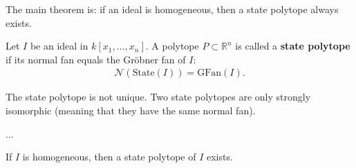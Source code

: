 \documentclass[a4paper, 11pt]{article}
\begin{document}

The main theorem is: if an ideal is homogeneous, then a state polytope always exists.

\begin{defi}
  Let \( I \) be an ideal in \( k[x_1, \dots, x_n] \). A polytope \( P \subset \mathbb R^n \) is called a \textbf{state polytope} if its normal fan equals the Gröbner fan of \( I \):
  \begin{align*}
    \mathcal{N}(\mathrm{State}(I)) = \mathrm{GFan}(I).
  \end{align*}
\end{defi}

\begin{remark}
  The state polytope is not unique. Two state polytopes are only strongly isomorphic (meaning that they have the same normal fan).
\end{remark}



\begin{eg}
...
\end{eg}

\begin{mdframed}
\begin{thm}
  If \( I \) is homogeneous, then a state polytope of \( I \) exists.
\end{thm}
\end{mdframed}
\end{document}
